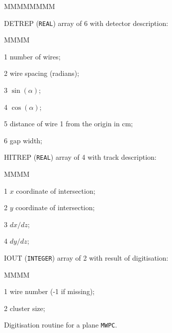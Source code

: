 \begin{DLtt}{MMMMMMMM}
\item[DETREP] ({\tt REAL}) array of 6 with detector description:
\begin{DLtt}{MMMM}
\item[1] number of wires;
\item[2] wire spacing (radians);
\item[3] $\sin(\alpha)$;
\item[4] $\cos(\alpha)$;
\item[5] distance of wire 1 from the origin in cm;
\item[6] gap width;
\end{DLtt}
\item[HITREP] ({\tt REAL}) array of 4 with track description:
\begin{DLtt}{MMMM}
\item[1] $x$ coordinate of intersection;
\item[2] $y$ coordinate of intersection;
\item[3] $dx/dz$;
\item[4] $dy/dz$;
\end{DLtt}
\item[IOUT] ({\tt INTEGER}) array of 2 with result of digitisation:
\begin{DLtt}{MMMM}
\item[1] wire number (-1 if missing);
\item[2] cluster size;
\end{DLtt}
\end{DLtt}
Digitisation routine for a plane {\tt MWPC}.
 
